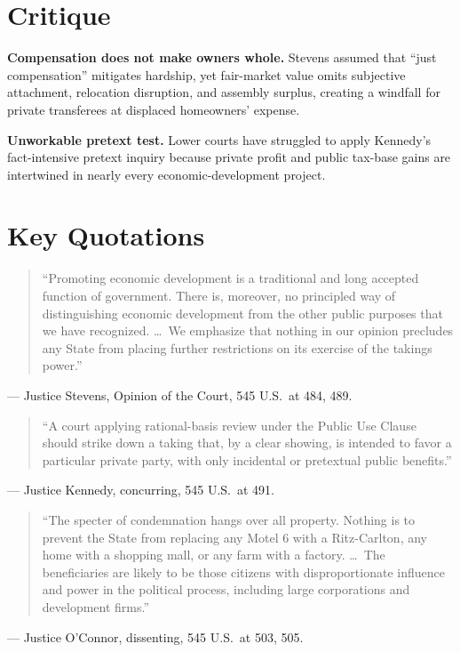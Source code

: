 \documentclass[12pt]{article}
\begin{document}
\section{Critique}

\textbf{Compensation does not make owners whole.} Stevens assumed that ``just compensation'' mitigates hardship, yet fair-market value omits subjective attachment, relocation disruption, and assembly surplus, creating a windfall for private transferees at displaced homeowners' expense.

\textbf{Unworkable pretext test.} Lower courts have struggled to apply Kennedy's fact-intensive pretext inquiry because private profit and public tax-base gains are intertwined in nearly every economic-development project.

\section{Key Quotations}

\begin{quote}
``Promoting economic development is a traditional and long accepted function of government. There is, moreover, no principled way of distinguishing economic development from the other public purposes that we have recognized. \dots\ We emphasize that nothing in our opinion precludes any State from placing further restrictions on its exercise of the takings power.''
\end{quote}
\noindent --- Justice Stevens, Opinion of the Court, 545 U.S.\ at 484, 489.

\begin{quote}
``A court applying rational-basis review under the Public Use Clause should strike down a taking that, by a clear showing, is intended to favor a particular private party, with only incidental or pretextual public benefits.''
\end{quote}
\noindent --- Justice Kennedy, concurring, 545 U.S.\ at 491.

\begin{quote}
``The specter of condemnation hangs over all property. Nothing is to prevent the State from replacing any Motel 6 with a Ritz-Carlton, any home with a shopping mall, or any farm with a factory. \dots\ The beneficiaries are likely to be those citizens with disproportionate influence and power in the political process, including large corporations and development firms.''
\end{quote}
\noindent --- Justice O'Connor, dissenting, 545 U.S.\ at 503, 505.
\end{document}
